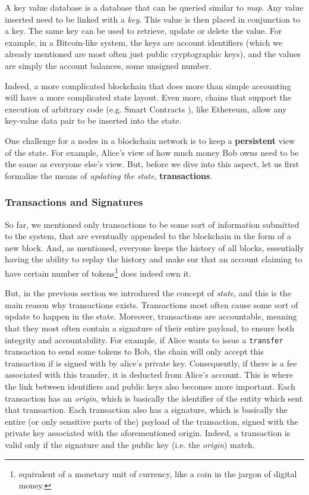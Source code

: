 A key value database is a database that can be queried similar to \textit{map}. Any value inserted
need to be linked with a \textit{key}. This value is then placed in conjunction to a key. The same
key can be used to retrieve, update or delete the value. For example, in a Bitcoin-like system, the
keys are account identifiers (which we already mentioned are most often just public cryptographic
keys), and the values are simply the account balances, some unsigned number.

Indeed, a more complicated blockchain that does more than simple accounting will have a more
complicated state layout. Even more, chains that support the execution of arbitrary code (e.g. Smart
Contracts \cite{EthereumWiki}), like Ethereum, allow any key-value data pair to be inserted into the
state.

One challenge for a nodes in a blockchain network is to keep a \textbf{persistent} view of the
state. For example, Alice's view of how much money Bob owns need to be the same as everyone else's
view. But, before we dive into this aspect, let us first formalize the means of \textit{updating the
state}, \textbf{transactions}.

\subsubsection{Transactions and Signatures} \label{chap_bg:subsec:transaction_sig}

So far, we mentioned only transactions to be some sort of information submitted to the system, that
are eventually appended to the blockchain in the form of a new block. And, as mentioned, everyone
keeps the history of all blocks, essentially having the ability to replay the history and make sur
that an account claiming to have certain number of tokens\footnote{equivalent of a monetary unit of
currency, like a coin in the jargon of digital money.} does indeed own it.

But, in the previous section we introduced the concept of \textit{state}, and this is the main
reason why transactions exists. Transactions most often cause some sort of update to happen in the
state. Moreover, transactions are accountable, meaning that they most often contain a signature of
their entire payload, to ensure both integrity and accountability. For example, if Alice wants to
issue a \texttt{transfer} transaction to send some tokens to Bob, the chain will only accept this
transaction if is signed with by alice's private key. Consequently, if there is a fee associated
with this transfer, it is deducted from Alice's account. This is where the link between identifiers
and public keys also becomes more important. Each transaction has an \textit{origin}, which is
basically the identifier of the entity which sent that transaction. Each transaction also has a
signature, which is basically the entire (or only sensitive parts of the) payload of the
transaction, signed with the private key associated with the aforementioned origin. Indeed, a
transaction is valid only if the signature and the public key (i.e. the \textit{origin}) match.

